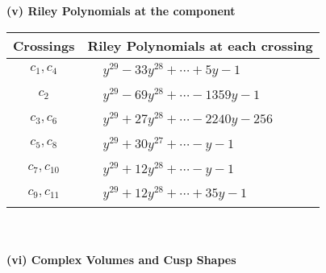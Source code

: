 \documentclass[1p]{elsarticle_modified}
\theoremstyle{definition}
\begin{document}
\newpage\renewcommand{\arraystretch}{1}
\flushleft \textbf{(v) Riley Polynomials at the component}\newline \\
\begin{tabular}{m{50pt}|m{274pt}}
Crossings & \hspace{64pt}Riley Polynomials at each crossing \\
\hline $$\begin{aligned}c_{1},c_{4}\end{aligned}$$&$\begin{aligned}
&y^{29}-33 y^{28}+\cdots+5 y-1
\end{aligned}$\\
\hline $$\begin{aligned}c_{2}\end{aligned}$$&$\begin{aligned}
&y^{29}-69 y^{28}+\cdots-1359 y-1
\end{aligned}$\\
\hline $$\begin{aligned}c_{3},c_{6}\end{aligned}$$&$\begin{aligned}
&y^{29}+27 y^{28}+\cdots-2240 y-256
\end{aligned}$\\
\hline $$\begin{aligned}c_{5},c_{8}\end{aligned}$$&$\begin{aligned}
&y^{29}+30 y^{27}+\cdots- y-1
\end{aligned}$\\
\hline $$\begin{aligned}c_{7},c_{10}\end{aligned}$$&$\begin{aligned}
&y^{29}+12 y^{28}+\cdots- y-1
\end{aligned}$\\
\hline $$\begin{aligned}c_{9},c_{11}\end{aligned}$$&$\begin{aligned}
&y^{29}+12 y^{28}+\cdots+35 y-1
\end{aligned}$\\
\hline
\end{tabular}\\~\\
\newpage\flushleft \textbf{(vi) Complex Volumes and Cusp Shapes}
\end{document}
